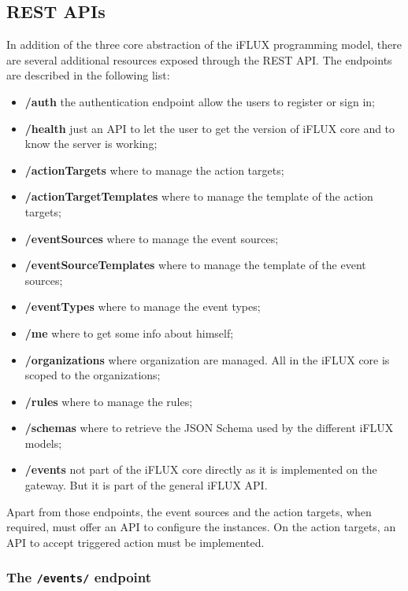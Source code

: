 \subsection{REST APIs}

In addition of the three core abstraction of the iFLUX programming model, there are several additional resources exposed through the REST API. The endpoints are described in the following list: 

\begin{itemize}
\item \textbf{/auth} the authentication endpoint allow the users to register or sign in;
\item \textbf{/health} just an API to let the user to get the version of iFLUX core and to know the server is working;
\item \textbf{/actionTargets} where to manage the action targets;
\item \textbf{/actionTargetTemplates} where to manage the template of the action targets;
\item \textbf{/eventSources} where to manage the event sources;
\item \textbf{/eventSourceTemplates} where to manage the template of the event sources;
\item \textbf{/eventTypes} where to manage the event types;
\item \textbf{/me} where to get some info about himself;
\item \textbf{/organizations} where organization are managed. All in the iFLUX core is scoped to the organizations;
\item \textbf{/rules} where to manage the rules;
\item \textbf{/schemas} where to retrieve the JSON Schema used by the different iFLUX models;
\item \textbf{/events} not part of the iFLUX core directly as it is implemented on the gateway. But it is part of the general iFLUX API.
\end{itemize}

Apart from those endpoints, the event sources and the action targets, when required, must offer an API to configure the instances. On the action targets, an API to accept triggered action must be implemented.

\subsubsection{The \texttt{/events/} endpoint}

